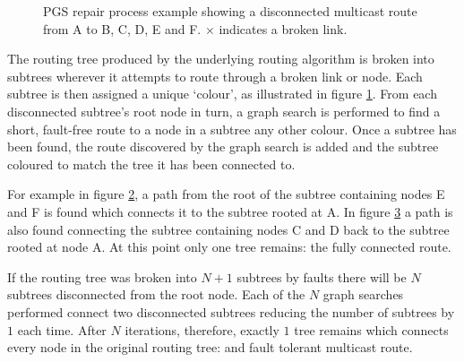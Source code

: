 		\begin{figure}
			\center
			\begin{subfigure}{0.32\linewidth}
				\hspace*{-1.5em}
				
				\caption{}
				\label{fig:pgs-repair-colouring}
			\end{subfigure}
			\begin{subfigure}{0.32\linewidth}
				\hspace*{-1.5em}
				
				\caption{}
				\label{fig:pgs-repair-colouring-fix1}
			\end{subfigure}
			\begin{subfigure}{0.32\linewidth}
				\hspace*{-1.5em}
				
				\caption{}
				\label{fig:pgs-repair-colouring-fix2}
			\end{subfigure}
			
			\caption{PGS repair process example showing a disconnected multicast
			route from A to B, C, D, E and F. $\times$ indicates a broken link.}
			\label{fig:pgs-repair-colouring-steps}
		\end{figure}
		
		The routing tree produced by the underlying routing algorithm is broken
		into subtrees wherever it attempts to route through a broken link or node.
		Each subtree is then assigned a unique `colour', as illustrated in figure
		\ref{fig:pgs-repair-colouring}. From each disconnected subtree's root node
		in turn, a graph search is performed to find a short, fault-free route to a
		node in a subtree any other colour. Once a subtree has been found, the
		route discovered by the graph search is added and the subtree coloured to
		match the tree it has been connected to.
		
		For example in figure \ref{fig:pgs-repair-colouring-fix1}, a path from the
		root of the subtree containing nodes E and F is found which connects it to
		the subtree rooted at A. In figure \ref{fig:pgs-repair-colouring-fix2} a
		path is also found connecting the subtree containing nodes C and D back to
		the subtree rooted at node A. At this point only one tree remains: the
		fully connected route.
		
		If the routing tree was broken into $N+1$ subtrees by faults there will be
		$N$ subtrees disconnected from the root node. Each of the $N$ graph
		searches performed connect two disconnected subtrees reducing the number of
		subtrees by $1$ each time. After $N$ iterations, therefore, exactly $1$
		tree remains which connects every node in the original routing tree: and
		fault tolerant multicast route.
		
